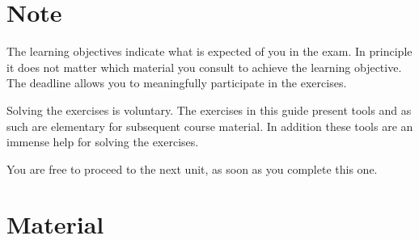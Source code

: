 \documentclass[11pt,a4paper]{article}
\begin{document}

	\section*{Note}
	The learning objectives indicate what is expected of you in the exam.
	In principle it does not matter which material you consult to achieve the learning objective.
	The deadline allows you to meaningfully participate in the exercises.
	
	Solving the exercises is voluntary.
	The exercises in this guide present tools and as such are elementary for subsequent course material.
	In addition these tools are an immense help for solving the exercises.
	
	You are free to proceed to the next unit, as soon as you complete this one.  

	\section{Material} 
	
\end{document}
